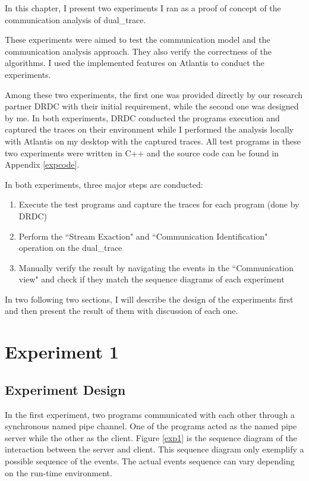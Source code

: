 


\label{chapter:Exp}
In this chapter, I present two experiments I ran as a proof of concept of the communication analysis of dual\_trace.

These experiments were aimed to test the communication model and the communication analysis approach. They also verify the correctness of the algorithms. I used the implemented features on Atlantis to conduct the experiments.

Among these two experiments, the first one was provided directly by our research partner DRDC with their initial requirement, while the second one was designed by me. In both experiments, DRDC conducted the programs execution and captured the traces on their environment while I performed the analysis locally with Atlantis on my desktop with the captured traces. All test programs in these two experiments were written in C++ and the source code can be found in Appendix \ref{expcode}. 

In both experiments, three major steps are conducted:
\begin{enumerate}
\item Execute the test programs and capture the traces for each program (done by DRDC)

\item Perform the ``Stream Exaction" and ``Communication Identification" operation on the dual\_trace

\item Manually verify the result by navigating the events in the ``Communication view" and check if they match the sequence diagrams of each experiment
\end{enumerate}

In two following two sections, I will describe the design of the experiments first and then present the result of them with discussion of each one.

\section{Experiment 1}
\subsection{Experiment Design}
In the first experiment, two programs communicated with each other through a synchronous named pipe channel. One of the programs acted as the named pipe server while the other as the client. Figure \ref{exp1} is the sequence diagram of the interaction between the server and client. This sequence diagram only exemplify a possible sequence of the events. The actual events sequence can vary depending on the run-time environment. 


